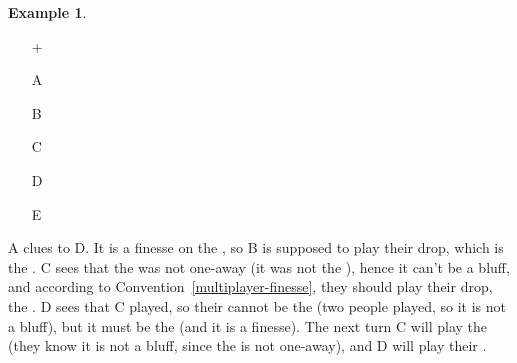 \documentclass[a4paper]{article}
\theoremstyle{plain}
\theoremstyle{definition}
\newtheorem{example}[theorem]{Example}
\begin{document}
\begin{example}	\hfill \\
	\begin{minipage}{0.45\textwidth}
		\begin{itemize}
			\item[\Large +]      
			\item[\Large A]    
			\item[\Large B]    
			\item[\Large C]    
			\item[\Large D]    
			\item[\Large E]    
		\end{itemize}
	\end{minipage}%
	\begin{minipage}{0.55\textwidth}
		A clues  to D. It is a finesse on the , so B is supposed to play their drop, which is the . C sees that the  was not one-away (it was not the ), hence it can't be a bluff, and according to Convention~\ref{multiplayer-finesse}, they should play their drop, the . D sees that C played, so their  cannot be the  (two people played, so it is not a bluff), but it must be the  (and it is a finesse). The next turn C will play the  (they know it is not a bluff, since the  is not one-away), and D will play their .
	\end{minipage}
\end{example} \vspace{0.15 cm}
\end{document}
